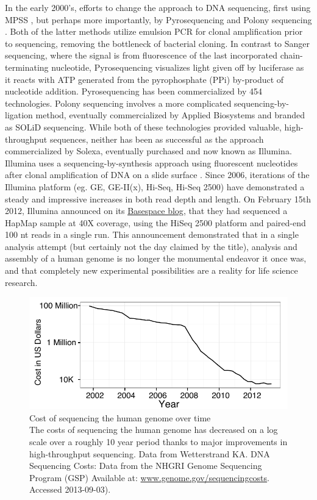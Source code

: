 In the early 2000’s, efforts to change the approach to DNA sequencing, first using MPSS \citep{Brenner2000a}, but perhaps more importantly, by Pyrosequencing \citep{Ronaghi1998a} and Polony sequencing \citep{Shendure2005}. Both of the latter methods utilize emulsion PCR \citep{Nakano2003a} for clonal amplification prior to sequencing, removing the bottleneck of bacterial cloning. In contrast to Sanger sequencing, where the signal is from fluorescence of the last incorporated chain-terminating nucleotide, Pyrosequencing visualizes light given off by luciferase as it reacts with ATP generated from the pyrophosphate (PPi) by-product of nucleotide addition. Pyrosequencing has been commercialized by 454 technologies. Polony sequencing involves a more complicated sequencing-by-ligation method, eventually commercialized by Applied Biosystems and branded as SOLiD sequencing. While both of these technologies provided valuable, high-throughput sequences, neither has been as successful as the approach commercialized by Solexa, eventually purchased and now known as Illumina.
Illumina uses a sequencing-by-synthesis approach using fluorescent nucleotides after clonal amplification of DNA on a slide surface \citep{Bentley2008}. Since 2006, iterations of the Illumina platform (eg. GE, GE-II(x), Hi-Seq, Hi-Seq 2500) have demonstrated a steady and impressive increases in both read depth and length. On February 15th 2012, Illumina announced on its \href{http://blog.basespace.illumina.com/}{Basespace blog}, that they had sequenced a HapMap sample at 40X coverage, using the HiSeq 2500 platform and paired-end 100 nt reads in a single run. This announcement demonstrated that in a single analysis attempt (but certainly not the day claimed by the title), analysis and assembly of a human genome is no longer the monumental endeavor it once was, and that completely new experimental possibilities are a reality for life science research.

\begin{figure}[htbp]
	\centering 
	\includegraphics{Figures/Chapter1/Sequencing_costs_over_time.pdf}
	\caption[Cost of sequencing the human genome over time]
	{
		Cost of sequencing the human genome over time\\[0.25cm]
		The costs of sequencing the human genome has decreased on a log scale over a roughly 10 year period thanks 
		to major improvements in high-throughput sequencing. Data from Wetterstrand KA. DNA Sequencing Costs: 
		Data from the NHGRI Genome Sequencing Program (GSP) Available at: \url{www.genome.gov/sequencingcosts}. Accessed 2013-09-03).
	}
	\label{fig:SeqCosts}
\end{figure}

